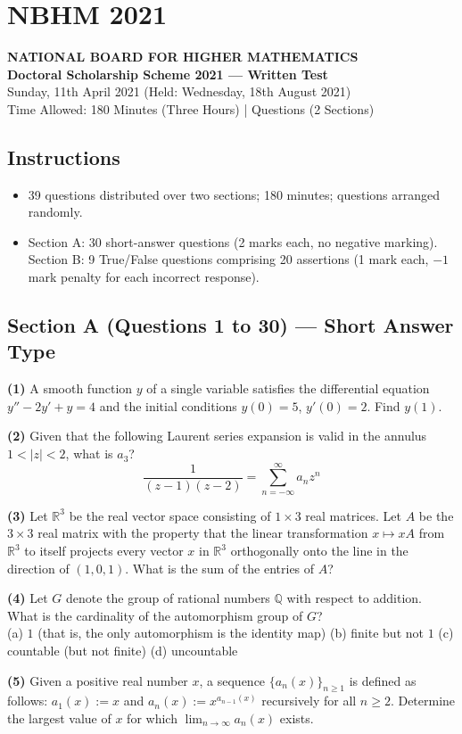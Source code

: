 \documentclass[11pt,a4paper]{article}
\newcommand{\Q}{\mathbb{Q}}
\newcommand{\R}{\mathbb{R}}
\newcommand{\examheader}[4]{%
  \clearpage
  \section{#1}
  \begin{center}
    {\large\bfseries NATIONAL BOARD FOR HIGHER MATHEMATICS}\\[3pt]
    {\bfseries #2}\\[2pt]
    {#3}\\[2pt]
    {\small #4}
  \end{center}
  \vspace{4pt}
}
\newcommand{\examsec}[1]{%
  \subsection*{#1}
  \vspace{-2pt}
}
\newcommand{\qitem}[1]{\par\medskip\noindent\textbf{#1}\hspace{0.5em}}
\begin{document}
\examheader{NBHM 2021}{Doctoral Scholarship Scheme 2021 --- Written Test}{Sunday, 11th April 2021 (Held: Wednesday, 18th August 2021)}{Time Allowed: 180 Minutes (Three Hours) \quad|\quad 39 Questions (2 Sections)}

\subsection*{Instructions}
\begin{itemize}
  \item 39 questions distributed over two sections; 180 minutes; questions arranged randomly.
  \item Section A: 30 short-answer questions (2 marks each, no negative marking). Section B: 9 True/False questions comprising 20 assertions (1 mark each, $-1$ mark penalty for each incorrect response).
\end{itemize}

\examsec{Section A (Questions 1 to 30) --- Short Answer Type}

\qitem{(1)} A smooth function $y$ of a single variable satisfies the differential equation $y'' - 2y' + y = 4$ and the initial conditions $y(0) = 5$, $y'(0) = 2$. Find $y(1)$.

\qitem{(2)} Given that the following Laurent series expansion is valid in the annulus $1 < |z| < 2$, what is $a_3$?
\[
  \frac{1}{(z - 1)(z - 2)} = \sum_{n=-\infty}^{\infty} a_n z^n
\]

\qitem{(3)} Let $\R^3$ be the real vector space consisting of $1 \times 3$ real matrices. Let $A$ be the $3 \times 3$ real matrix with the property that the linear transformation $x \mapsto xA$ from $\R^3$ to itself projects every vector $x$ in $\R^3$ orthogonally onto the line in the direction of $(1, 0, 1)$. What is the sum of the entries of $A$?

\qitem{(4)} Let $G$ denote the group of rational numbers $\Q$ with respect to addition. What is the cardinality of the automorphism group of $G$?\\
(a) $1$ (that is, the only automorphism is the identity map) \quad (b) finite but not $1$ \quad (c) countable (but not finite) \quad (d) uncountable

\qitem{(5)} Given a positive real number $x$, a sequence $\{a_n(x)\}_{n \ge 1}$ is defined as follows: $a_1(x) := x$ and $a_n(x) := x^{a_{n-1}(x)}$ recursively for all $n \ge 2$. Determine the largest value of $x$ for which $\lim_{n \to \infty} a_n(x)$ exists.
\end{document}
